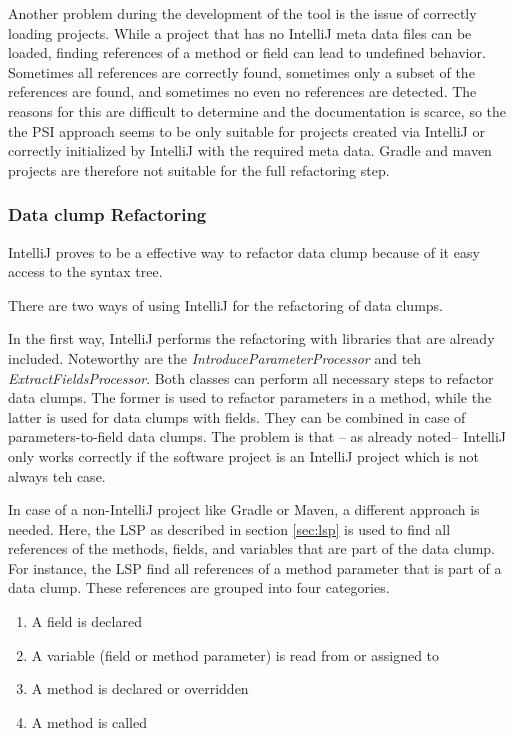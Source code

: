 Another problem during the development of the tool is the issue of correctly loading projects. While a project that has no IntelliJ meta data files can be loaded, finding references of a method or field can lead to undefined behavior. Sometimes all references are correctly found, sometimes only a subset of the references are found, and sometimes no even no references are detected. The reasons for this are difficult to determine and the documentation is scarce, so the the PSI approach seems to be only suitable for projects created via IntelliJ or correctly initialized by IntelliJ with the required meta data. Gradle and maven projects are therefore not suitable for the full refactoring step. 

\subsubsection{Data clump Refactoring}

IntelliJ proves to be a effective way to refactor data clump because of it easy access to the syntax tree.

There are two ways of using IntelliJ for the refactoring of data clumps.

In the first way, IntelliJ performs the refactoring with libraries that are already included. Noteworthy are the \textit{IntroduceParameterProcessor} and teh \textit{ExtractFieldsProcessor}. Both classes can perform all necessary steps to refactor data clumps. The former is used to refactor parameters in a method, while the latter is used for data clumps with fields. They can be combined in case of parameters-to-field data clumps. The problem is that -- as already noted-- IntelliJ only works correctly if the software project is an IntelliJ project which is not always teh case.

In case of a non-IntelliJ project like Gradle or Maven, a different approach is needed. Here, the \ac{LSP} as described in section \ref{sec:lsp} is used to find all references of the methods, fields, and variables that are part of the data clump. For instance, the \ac{LSP} find all references of a method parameter that is part of a data clump. These references are grouped into four categories. 
\begin{enumerate}
     \item A field is declared
    \item A variable (field or method parameter) is read from or assigned to
   
    \item A method is declared or overridden
    \item A method is called
\end{enumerate}


